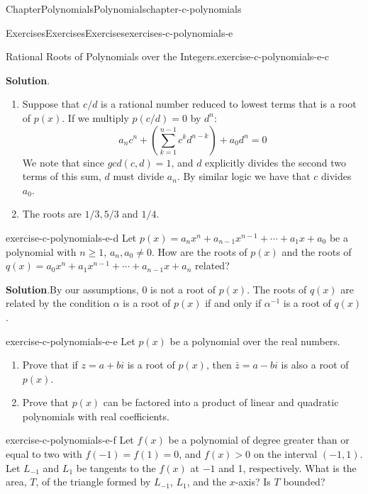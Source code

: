 \documentclass[oneside,10pt,]{book}
\newcommand{\blocktitlefont}{\relax}
\numberwithin{equation}{section}
\begin{document}
\begin{chapterptx}{Chapter}{Polynomials}{}{Polynomials}{}{}{chapter-c-polynomials}
\begin{exercises-section}{Exercises}{Exercises}{}{Exercises}{}{}{exercises-c-polynomials-e}
\begin{divisionexercise}{2}{Rational Roots of Polynomials over the Integers.}{}{exercise-c-polynomials-e-c}
%
\par\smallskip%
\noindent\textbf{\blocktitlefont Solution}.\hypertarget{solution-c-polynomials-e-c-c}{}\quad{}%
\begin{enumerate}[label=(\alph*)]
\item{}Suppose that \(c/d\) is a rational number reduced to lowest terms that is a root of \(p(x)\). If we multiply \(p(c/d)=0\) by \(d^n\):%
\begin{equation*}
a_n c^n +\left( \sum_{k=1}^{n-1}	 c^k d^{n-k}\right) + a_0 d^n = 0
\end{equation*}
We note that since \(gcd(c, d) = 1\), and \(d\) explicitly divides the second two terms of this sum, \(d\) must divide \(a_n\).  By similar logic we have that \(c\) divides \(a_0\).%
\item{}The roots are \(1/3, 5/3\) and \(1/4\).%
\end{enumerate}
%
\end{divisionexercise}%
\begin{divisionexercise}{3}{}{}{exercise-c-polynomials-e-d}%
Let \(p(x)= a_n x^n + a_{n-1}x^{n-1}+ \cdots +a_1 x + a_0\) be a polynomial with \(n\geq 1\), \(a_n, a_0 \neq 0\). How are the roots of \(p(x)\) and the roots of  \(q(x)= a_0 x^n + a_1 x^{n-1}+ \cdots +a_{n-1} x + a_n\) related?%
\par\smallskip%
\noindent\textbf{\blocktitlefont Solution}.\hypertarget{solution-c-polynomials-e-d-b}{}\quad{}By our assumptions, \(0\) is not a root of \(p(x)\).  The roots of \(q(x)\) are related by the condition \(\alpha\) is a root of \(p(x)\) if and only if  \(\alpha^{-1}\) is a root of  \(q(x)\).%
\end{divisionexercise}%
\begin{divisionexercise}{4}{}{}{exercise-c-polynomials-e-e}%
Let \(p(x)\) be a polynomial over the real numbers.%
\begin{enumerate}[label=(\alph*)]
\item{}Prove that if \(z=a + b i\) is a root of \(p(x)\), then \(\bar{z}= a -b i\) is also a root of \(p(x)\).%
\item{}Prove that \(p(x)\) can be factored into a product of linear and quadratic polynomials with real coefficients.%
\end{enumerate}
%
\end{divisionexercise}%
\begin{divisionexercise}{5}{}{}{exercise-c-polynomials-e-f}%
Let \(f(x)\) be a polynomial of degree greater than or equal to two with \(f(-1)=f(1)=0\), and \(f(x)>0\) on the interval \((-1,1)\).  Let \(L_{-1}\) and \(L_1\) be tangents to the \(f(x)\) at \(-1\) and 1, respectively. What is the area, \(T\), of the triangle formed by \(L_{-1}\), \(L_1\), and the \(x\)-axis?  Is \(T\) bounded?%

\end{divisionexercise}
\end{exercises-section}
\end{chapterptx}
\end{document}

